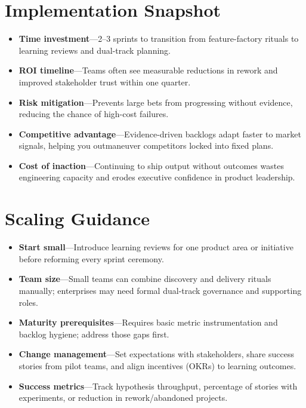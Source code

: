 \section{Implementation Snapshot}
\label{sec:failures-snapshot}
\begin{itemize}
    \item \textbf{Time investment}—2--3 sprints to transition from feature-factory rituals to learning reviews and dual-track planning.
    \item \textbf{ROI timeline}—Teams often see measurable reductions in rework and improved stakeholder trust within one quarter.
    \item \textbf{Risk mitigation}—Prevents large bets from progressing without evidence, reducing the chance of high-cost failures.
    \item \textbf{Competitive advantage}—Evidence-driven backlogs adapt faster to market signals, helping you outmaneuver competitors locked into fixed plans.
    \item \textbf{Cost of inaction}—Continuing to ship output without outcomes wastes engineering capacity and erodes executive confidence in product leadership.
\end{itemize}

\section{Scaling Guidance}
\label{sec:failures-scaling}
\begin{itemize}
    \item \textbf{Start small}—Introduce learning reviews for one product area or initiative before reforming every sprint ceremony.
    \item \textbf{Team size}—Small teams can combine discovery and delivery rituals manually; enterprises may need formal dual-track governance and supporting roles.
    \item \textbf{Maturity prerequisites}—Requires basic metric instrumentation and backlog hygiene; address those gaps first.
    \item \textbf{Change management}—Set expectations with stakeholders, share success stories from pilot teams, and align incentives (OKRs) to learning outcomes.
    \item \textbf{Success metrics}—Track hypothesis throughput, percentage of stories with experiments, or reduction in rework/abandoned projects.
\end{itemize}

